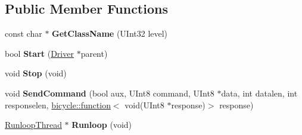 \subsection*{Public Member Functions}
\begin{DoxyCompactItemize}
\item 
\mbox{\label{class_standard_p_c___internal_1_1_p_s2_controller_ae80d510e1b645ee598738d16994268c9}} 
const char $\ast$ {\bfseries Get\+Class\+Name} (U\+Int32 level)
\item 
\mbox{\label{class_standard_p_c___internal_1_1_p_s2_controller_a3027c3ff6f74c8884f9469e7e6774ed1}} 
bool {\bfseries Start} (\hyperlink{class_driver}{Driver} $\ast$parent)
\item 
\mbox{\label{class_standard_p_c___internal_1_1_p_s2_controller_af3b13eeaaddbcf9079c51fd17f14fa15}} 
void {\bfseries Stop} (void)
\item 
\mbox{\label{class_standard_p_c___internal_1_1_p_s2_controller_a2183dfc3e43c5599ccf5d15236c8dfcf}} 
void {\bfseries Send\+Command} (bool aux, U\+Int8 command, U\+Int8 $\ast$data, int datalen, int responselen, \hyperlink{classbicycle_1_1function}{bicycle\+::function}$<$ void(U\+Int8 $\ast$response)$>$ response)
\item 
\mbox{\label{class_standard_p_c___internal_1_1_p_s2_controller_a2140ceecc900ec8de0d0085350f43c5b}} 
\hyperlink{class_runloop_thread}{Runloop\+Thread} $\ast$ {\bfseries Runloop} (void)
\end{DoxyCompactItemize}
